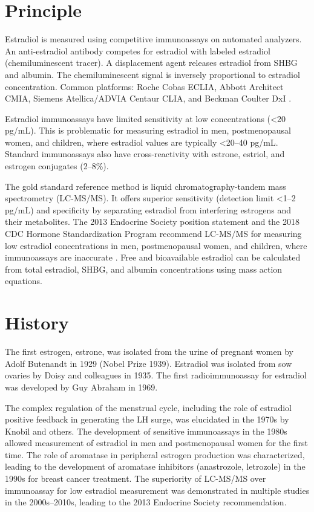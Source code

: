 \section*{Principle}
Estradiol is measured using competitive immunoassays on automated analyzers. An anti-estradiol antibody competes for estradiol with labeled estradiol (chemiluminescent tracer). A displacement agent releases estradiol from SHBG and albumin. The chemiluminescent signal is inversely proportional to estradiol concentration. Common platforms: Roche Cobas ECLIA, Abbott Architect CMIA, Siemens Atellica/ADVIA Centaur CLIA, and Beckman Coulter DxI \cite{tietz2023textbook}.

Estradiol immunoassays have limited sensitivity at low concentrations (<20 pg/mL). This is problematic for measuring estradiol in men, postmenopausal women, and children, where estradiol values are typically <20--40 pg/mL. Standard immunoassays also have cross-reactivity with estrone, estriol, and estrogen conjugates (2--8\%).

The gold standard reference method is liquid chromatography-tandem mass spectrometry (LC-MS/MS). It offers superior sensitivity (detection limit <1--2 pg/mL) and specificity by separating estradiol from interfering estrogens and their metabolites. The 2013 Endocrine Society position statement and the 2018 CDC Hormone Standardization Program recommend LC-MS/MS for measuring low estradiol concentrations in men, postmenopausal women, and children, where immunoassays are inaccurate \cite{rosner2013challenges}. Free and bioavailable estradiol can be calculated from total estradiol, SHBG, and albumin concentrations using mass action equations.

\section*{History}
The first estrogen, estrone, was isolated from the urine of pregnant women by Adolf Butenandt in 1929 (Nobel Prize 1939). Estradiol was isolated from sow ovaries by Doisy and colleagues in 1935. The first radioimmunoassay for estradiol was developed by Guy Abraham in 1969.

The complex regulation of the menstrual cycle, including the role of estradiol positive feedback in generating the LH surge, was elucidated in the 1970s by Knobil and others. The development of sensitive immunoassays in the 1980s allowed measurement of estradiol in men and postmenopausal women for the first time. The role of aromatase in peripheral estrogen production was characterized, leading to the development of aromatase inhibitors (anastrozole, letrozole) in the 1990s for breast cancer treatment. The superiority of LC-MS/MS over immunoassay for low estradiol measurement was demonstrated in multiple studies in the 2000s--2010s, leading to the 2013 Endocrine Society recommendation.

